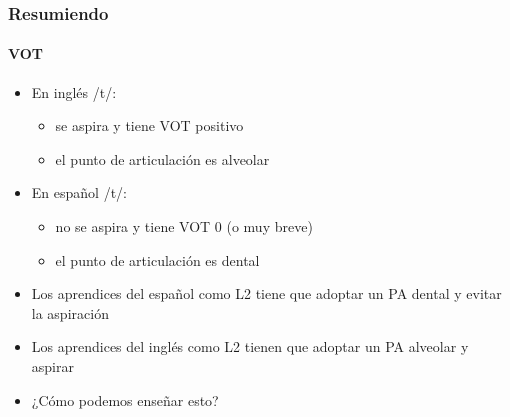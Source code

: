\documentclass{beamer}
\begin{document}
\begin{frame}
	\frametitle{Resumiendo}
	\framesubtitle{VOT}

	\begin{itemize}
		\item En inglés /t/: 
		\begin{itemize}
			\item se aspira y tiene VOT positivo
			\item el punto de articulación es alveolar
		\end{itemize} 
		\item En español /t/:
		\begin{itemize}
			\item no se aspira y tiene VOT 0 (o muy breve)
			\item el punto de articulación es dental
		\end{itemize} 
		\item Los aprendices del español como L2 tiene que adoptar un PA dental y evitar la aspiración
		\item Los aprendices del inglés como L2 tienen que adoptar un PA alveolar y aspirar
	\end{itemize}
\end{frame}

\begin{frame}
	
	\begin{itemize}
		\item ¿Cómo podemos enseñar esto?
	\end{itemize}
\end{frame}
	
\end{document}
